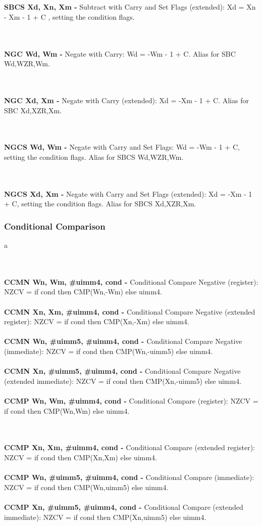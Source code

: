 \documentclass[12pt,a4paper,utf8]{ppgsi}
\begin{document}
\\\\\textbf{SBCS Xd, Xn, Xm -} Subtract with Carry and Set Flags (extended): Xd = Xn - Xm - 1 + C , setting the condition flags. 

\\\\\textbf{NGC Wd, Wm -} Negate with Carry: Wd = -Wm - 1 + C.
Alias for SBC Wd,WZR,Wm.

\\\\\textbf{NGC Xd, Xm -} Negate with Carry (extended): Xd = -Xm - 1 + C.
Alias for SBC Xd,XZR,Xm.

\\\\\textbf{NGCS Wd, Wm -} Negate with Carry and Set Flags: Wd = -Wm - 1 + C, setting the condition flags.
Alias for SBCS Wd,WZR,Wm.

\\\\\textbf{NGCS Xd, Xm -} Negate with Carry and Set Flags (extended): Xd = -Xm - 1 + C, setting the condition flags.
Alias for SBCS Xd,XZR,Xm.


\subsubsection{Conditional Comparison}
a

\\\\\textbf{CCMN Wn, Wm, \#uimm4, cond -} Conditional Compare Negative (register):
NZCV = if cond then CMP(Wn,-Wm) else uimm4. 
\\\\\textbf{CCMN Xn, Xm, \#uimm4, cond -} Conditional Compare Negative (extended register):
NZCV = if cond then CMP(Xn,-Xm) else uimm4. 
\\\\\textbf{CCMN Wn, \#uimm5, \#uimm4, cond -} Conditional Compare Negative (immediate):
NZCV = if cond then CMP(Wn,-uimm5) else uimm4. 
\\\\\textbf{CCMN Xn, \#uimm5, \#uimm4, cond -} Conditional Compare Negative (extended immediate):
NZCV = if cond then CMP(Xn,-uimm5) else uimm4.
\\\\\textbf{CCMP Wn, Wm, \#uimm4, cond -} Conditional Compare (register):
NZCV = if cond then CMP(Wn,Wm) else uimm4. 

\\\\\textbf{CCMP Xn, Xm, \#uimm4, cond -} Conditional Compare (extended register):
NZCV = if cond then CMP(Xn,Xm) else uimm4. 
\\\\\textbf{CCMP Wn, \#uimm5, \#uimm4, cond -} Conditional Compare (immediate):
NZCV = if cond then CMP(Wn,uimm5) else uimm4. 
\\\\\textbf{CCMP Xn, \#uimm5, \#uimm4, cond -} Conditional Compare (extended immediate):
NZCV = if cond then CMP(Xn,uimm5) else uimm4.
\end{document}
